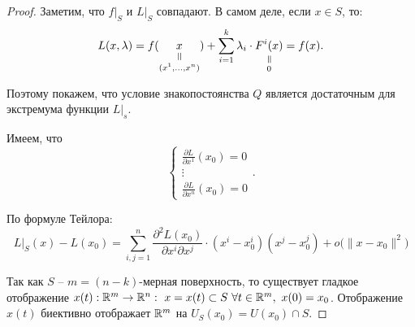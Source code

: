 \begin{proof}
    Заметим, что $f\big|_S$ и $L\big|_S$ совпадают. В самом деле, если $x\in S$, то:
    \[
        L(x,\lambda) = f(\equalto{x}{(x^1,\ldots,x^n)}) + \sum_{i=1}^{k}\lambda_i\cdot \equalto{F^i(x)}{0} = f(x).
    \]

    Поэтому покажем, что условие знакопостоянства $Q$ является достаточным для экстремума функции $L\big|_s$.

    Имеем, что
    \[
        \left\{\begin{array}{l}
            \frac{\partial L}{\partial x^1}(x_0) = 0 \\
            \vdots                               \\
            \frac{\partial L}{\partial x^n}(x_0) = 0
        \end{array}\right..
    \]

    По формуле Тейлора:
    \begin{equation}\label{eq:25}
        L\big|_S(x) - L(x_0) = \sum_{i,j=1}^{n}\frac{\partial^2 L(x_0)}{\partial x^i \partial x^j}\cdot(x^i - x_0^i)(x^j - x_0^j) + o\big(\|x-x_0\|^2\big)
    \end{equation}

    Так как $S$ -- $m=(n-k)$-мерная поверхность, то существует гладкое отображение $x(t):\R^m\rightarrow\R^n: \ x = x(t) \subset S \ \forall t \in \R^m, \ x(0) = x_0$. Отображение $x(t)$ биективно отображает $\mathbb{R}^m$ на $U_S(x_0) = U(x_0)\cap S$.


\end{proof}
